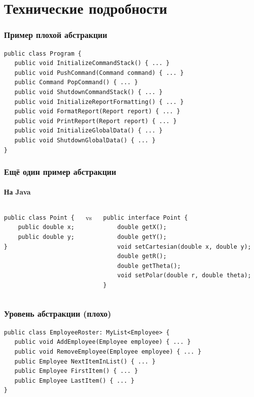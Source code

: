 \documentclass[xetex,mathserif,serif]{beamer}
\begin{document}
	\section{Технические подробности}

	\begin{frame}[fragile]
		\frametitle{Пример плохой абстракции}
		\begin{verbatim}
public class Program {
   public void InitializeCommandStack() { ... }
   public void PushCommand(Command command) { ... }
   public Command PopCommand() { ... }
   public void ShutdownCommandStack() { ... }
   public void InitializeReportFormatting() { ... }
   public void FormatReport(Report report) { ... }
   public void PrintReport(Report report) { ... }
   public void InitializeGlobalData() { ... }
   public void ShutdownGlobalData() { ... }
}
		\end{verbatim}
	\end{frame}

	\begin{frame}[fragile]
		\frametitle{Ещё один пример абстракции}
		\framesubtitle{На Java}
		\begin{columns}
			\begin{column}{0.32\textwidth}
				\begin{verbatim}
public class Point {
    public double x;
    public double y;
}
				\end{verbatim}
			\end{column}
			\begin{column}{0.05\textwidth}
				vs
			\end{column}
			\begin{column}{0.6\textwidth}
				\begin{verbatim}
public interface Point {
    double getX();
    double getY();
    void setCartesian(double x, double y);
    double getR();
    double getTheta();
    void setPolar(double r, double theta);
}
				\end{verbatim}
			\end{column}
		\end{columns}
	\end{frame}

	\begin{frame}[fragile]
		\frametitle{Уровень абстракции (плохо)}
		\begin{verbatim}
public class EmployeeRoster: MyList<Employee> {
   public void AddEmployee(Employee employee) { ... }
   public void RemoveEmployee(Employee employee) { ... }
   public Employee NextItemInList() { ... }
   public Employee FirstItem() { ... }
   public Employee LastItem() { ... }
}
		\end{verbatim}
	\end{frame}
\end{document}

